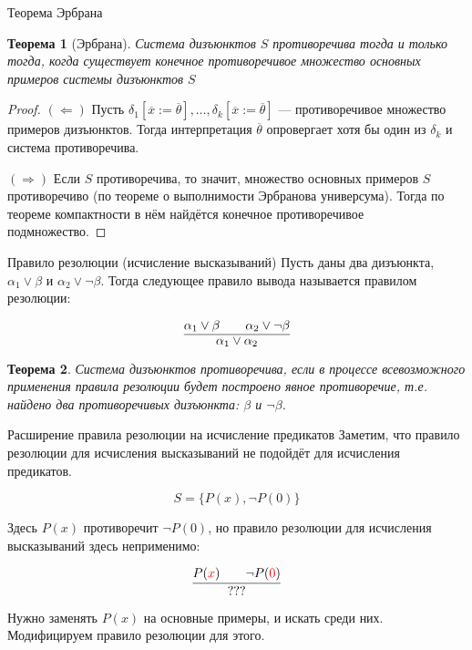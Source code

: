 \documentclass[aspectratio=169]{beamer}
\newtheorem{thm}{Теорема}[section]
\begin{document}
\begin{frame}{Теорема Эрбрана}
\begin{thm}[Эрбрана]Система дизъюнктов $S$ противоречива тогда и только тогда, когда существует
конечное противоречивое множество основных примеров системы дизъюнктов $S$\end{thm}
\begin{proof}$(\Leftarrow)$ 
Пусть $\delta_1[\overline{x} := \overline{\theta}],\dots,\delta_k[\overline{x} := \overline{\theta}]$ 
--- противоречивое множество примеров дизъюнктов. Тогда интерпретация $\overline{\theta}$
опровергает хотя бы один из $\delta_k$ и система противоречива.

$(\Rightarrow)$ Если $S$ противоречива, то значит, множество основных примеров $S$
противоречиво (по теореме о выполнимости Эрбранова универсума). Тогда по теореме компактности
в нём найдётся конечное противоречивое подмножество.
\end{proof}
\end{frame}

\begin{frame}{Правило резолюции (исчисление высказываний)}
Пусть даны два дизъюнкта, $\alpha_1 \vee \beta$ и $\alpha_2 \vee \neg \beta$.
Тогда следующее правило вывода называется правилом резолюции:

$$\infer{\alpha_1\vee \alpha_2}{\alpha_1\vee \beta\quad\quad \alpha_2\vee\neg \beta}$$

\begin{thm}Система дизъюнктов противоречива, если в процессе всевозможного применения
правила резолюции будет построено явное противоречие,
т.е. найдено два противоречивых дизъюнкта: $\beta$ и $\neg\beta$.
\end{thm}
\end{frame}

\begin{frame}{Расширение правила резолюции на исчисление предикатов}
Заметим, что правило резолюции для исчисления высказываний не подойдёт для исчисления предикатов.

$$S = \{ P(x), \neg P(0)\}$$

Здесь $P(x)$ противоречит $\neg P(0)$, но правило резолюции для исчисления высказываний здесь неприменимо:

$$\infer{???}{P({\color{red}x})\quad\quad\neg P({\color{red}0})}$$

Нужно заменять $P(x)$ на основные примеры, и искать среди них. Модифицируем правило резолюции для этого.

\end{frame}
\end{document}
